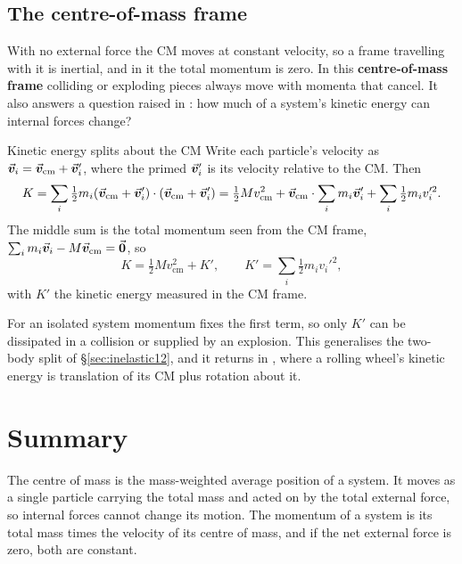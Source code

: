 \begin{figure}[htbp]
\centering
{}
\end{figure}

\subsection{The centre-of-mass frame}\label{sec:cmframe}

With no external force the CM moves at constant velocity, so a frame travelling with it is inertial, and
in it the total momentum is zero. In this \textbf{centre-of-mass frame} colliding or exploding pieces always
move with momenta that cancel. It also answers a question raised in : how much of a
system's kinetic energy can internal forces change?

\begin{derivbox}{Kinetic energy splits about the CM}
Write each particle's velocity as $\vec{\bm{v}}_i=\vec{\bm{v}}_{\text{cm}}+\vec{\bm{v}}_i'$, where the primed $\vec{\bm{v}}_i'$ is its
velocity relative to the CM. Then
\[
K=\sum_i\tfrac12m_i(\vec{\bm{v}}_{\text{cm}}+\vec{\bm{v}}_i')\cdot(\vec{\bm{v}}_{\text{cm}}+\vec{\bm{v}}_i')
=\tfrac12Mv_{\text{cm}}^2+\vec{\bm{v}}_{\text{cm}}\cdot\sum_i m_i\vec{\bm{v}}_i'+\sum_i\tfrac12m_iv_i'^2 .
\]
The middle sum is the total momentum seen from the CM frame, $\sum_i m_i\vec{\bm{v}}_i-M\vec{\bm{v}}_{\text{cm}}=\vec{\bm{0}}$, so
\[
\boxed{K=\tfrac12Mv_{\text{cm}}^2+K'},\qquad K'=\sum_i\tfrac12m_iv_i'^2,
\]
with $K'$ the kinetic energy measured in the CM frame.
\end{derivbox}

For an isolated system momentum fixes the first term, so only $K'$ can be dissipated in a collision or
supplied by an explosion. This
generalises the two-body split of \S\ref{sec:inelastic12}, and it returns in , where a
rolling wheel's kinetic energy is translation of its CM plus rotation about it.

\section{Summary}\label{sec:summary13}
The centre of mass is the mass-weighted average position of a system. It moves as a single particle carrying
the total mass and acted on by the total external force, so internal forces cannot change its motion. The
momentum of a system is its total mass times the velocity of its centre of mass, and if the net external force
is zero, both are constant.

